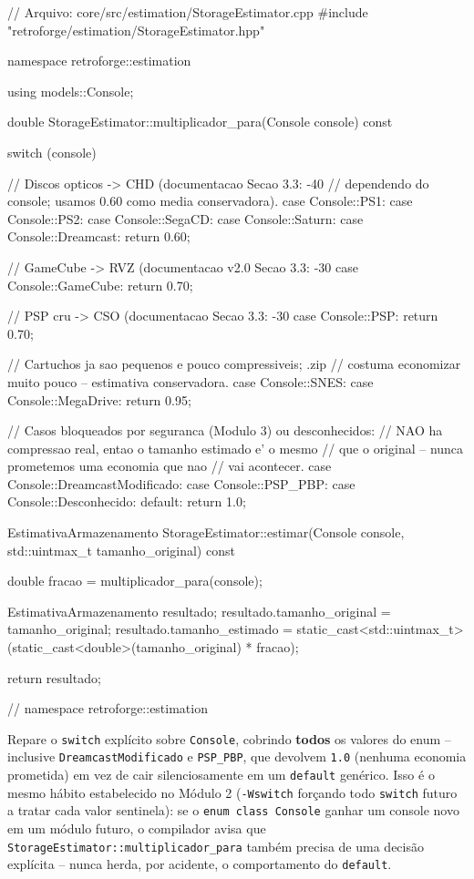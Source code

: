 \begin{CaixaCodigo}
// Arquivo: core/src/estimation/StorageEstimator.cpp
#include "retroforge/estimation/StorageEstimator.hpp"

namespace retroforge::estimation {

using models::Console;

double StorageEstimator::multiplicador_para(Console console) const {
    switch (console) {
        // Discos opticos -> CHD (documentacao Secao 3.3: -40%
        // dependendo do console; usamos 0.60 como media conservadora).
        case Console::PS1:
        case Console::PS2:
        case Console::SegaCD:
        case Console::Saturn:
        case Console::Dreamcast:
            return 0.60;

        // GameCube -> RVZ (documentacao v2.0 Secao 3.3: -30%
        case Console::GameCube:
            return 0.70;

        // PSP cru -> CSO (documentacao Secao 3.3: -30%
        case Console::PSP:
            return 0.70;

        // Cartuchos ja sao pequenos e pouco compressiveis; .zip
        // costuma economizar muito pouco -- estimativa conservadora.
        case Console::SNES:
        case Console::MegaDrive:
            return 0.95;

        // Casos bloqueados por seguranca (Modulo 3) ou desconhecidos:
        // NAO ha compressao real, entao o tamanho estimado e' o mesmo
        // que o original -- nunca prometemos uma economia que nao
        // vai acontecer.
        case Console::DreamcastModificado:
        case Console::PSP_PBP:
        case Console::Desconhecido:
        default:
            return 1.0;
    }
}

EstimativaArmazenamento StorageEstimator::estimar(Console console,
                                                    std::uintmax_t tamanho_original) const {
    double fracao = multiplicador_para(console);

    EstimativaArmazenamento resultado;
    resultado.tamanho_original = tamanho_original;
    resultado.tamanho_estimado =
        static_cast<std::uintmax_t>(static_cast<double>(tamanho_original) * fracao);

    return resultado;
}

} // namespace retroforge::estimation
\end{CaixaCodigo}

\begin{CaixaAlerta}
Repare o \texttt{switch} explícito sobre \texttt{Console}, cobrindo \textbf{todos} os valores do enum -- inclusive \texttt{DreamcastModificado} e \texttt{PSP\_PBP}, que devolvem \texttt{1.0} (nenhuma economia prometida) em vez de cair silenciosamente em um \texttt{default} genérico. Isso é o mesmo hábito estabelecido no Módulo 2 (\texttt{-Wswitch} forçando todo \texttt{switch} futuro a tratar cada valor sentinela): se o \texttt{enum class Console} ganhar um console novo em um módulo futuro, o compilador avisa que \texttt{StorageEstimator::multiplicador\_para} também precisa de uma decisão explícita -- nunca herda, por acidente, o comportamento do \texttt{default}.
\end{CaixaAlerta}

